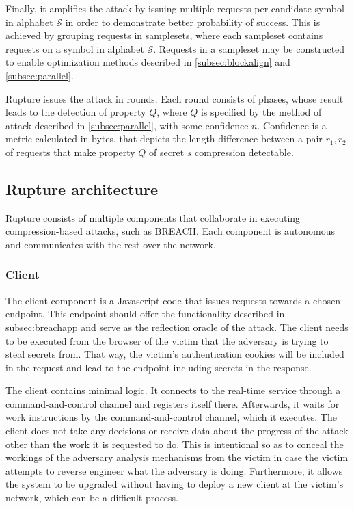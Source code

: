 \documentclass{sig-alternate-05-2015}
\begin{document}
Finally, it amplifies the attack by issuing multiple requests per candidate
symbol in alphabet $\mathcal{S}$ in order to demonstrate better probability of
success. This is achieved by grouping requests in samplesets, where each
sampleset contains requests on a symbol in alphabet $\mathcal{S}$. Requests in a
sampleset may be constructed to enable optimization methods described in
\ref{subsec:blockalign} and \ref{subsec:parallel}.

Rupture issues the attack in rounds. Each round consists of phases, whose result
leads to the detection of property $Q$, where $Q$ is specified by the method of
attack described in \ref{subsec:parallel}, with some confidence $n$. Confidence
is a metric calculated in bytes, that depicts the length difference between a
pair $r_1, r_2$ of requests that make property $Q$ of secret $s$ compression
detectable.

\subsection{Rupture architecture}\label{app:rupture}
Rupture consists of multiple components that collaborate in executing
compression-based attacks, such as BREACH. Each component is autonomous and
communicates with the rest over the network.

\subsubsection{Client}

The client component is a Javascript code that issues requests towards a chosen
endpoint. This endpoint should offer the functionality described in
{subsec:breachapp} and serve as the reflection oracle of the attack. The client
needs to be executed from the browser of the victim that the adversary is trying
to steal secrets from. That way, the victim's authentication cookies will be
included in the request and lead to the endpoint including secrets in the
response.

The client contains minimal logic. It connects to the real-time service through
a command-and-control channel and registers itself there. Afterwards, it waits
for work instructions by the command-and-control channel, which it executes. The
client does not take any decisions or receive data about the progress of the
attack other than the work it is requested to do. This is intentional so as
to conceal the workings of the adversary analysis mechanisms from the victim
in case the victim attempts to reverse engineer what the adversary is doing.
Furthermore, it allows the system to be upgraded without having to deploy a
new client at the victim's network, which can be a difficult process.
\end{document}
